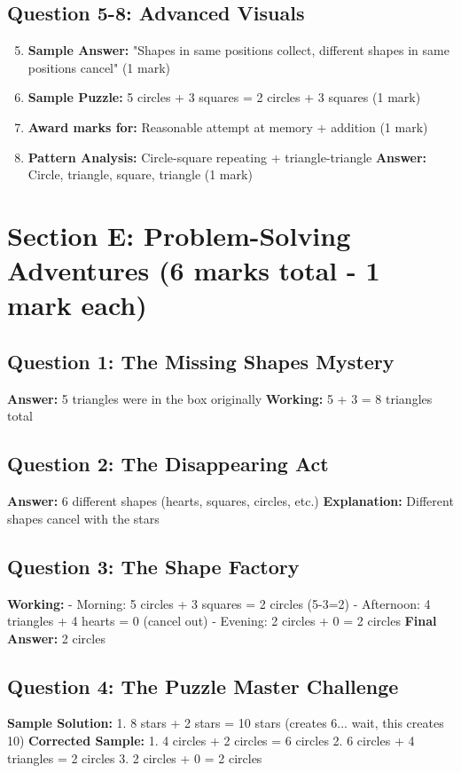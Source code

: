 \documentclass{article}
\begin{document}
\subsection*{Question 5-8: Advanced Visuals}
\begin{enumerate}
    \setcounter{enumi}{4}
    \item \textbf{Sample Answer:} "Shapes in same positions collect, different shapes in same positions cancel" (1 mark)
    
    \item \textbf{Sample Puzzle:} 5 circles + 3 squares = 2 circles + 3 squares (1 mark)
    
    \item \textbf{Award marks for:} Reasonable attempt at memory + addition (1 mark)
    
    \item \textbf{Pattern Analysis:} Circle-square repeating + triangle-triangle
          \textbf{Answer:} Circle, triangle, square, triangle (1 mark)
\end{enumerate}

\section{Section E: Problem-Solving Adventures (6 marks total - 1 mark each)}

\subsection*{Question 1: The Missing Shapes Mystery}
\textbf{Answer:} 5 triangles were in the box originally
\textbf{Working:} 5 + 3 = 8 triangles total

\subsection*{Question 2: The Disappearing Act}  
\textbf{Answer:} 6 different shapes (hearts, squares, circles, etc.)
\textbf{Explanation:} Different shapes cancel with the stars

\subsection*{Question 3: The Shape Factory}
\textbf{Working:}
- Morning: 5 circles + 3 squares = 2 circles (5-3=2)
- Afternoon: 4 triangles + 4 hearts = 0 (cancel out)  
- Evening: 2 circles + 0 = 2 circles
\textbf{Final Answer:} 2 circles

\subsection*{Question 4: The Puzzle Master Challenge}
\textbf{Sample Solution:}
1. 8 stars + 2 stars = 10 stars (creates 6... wait, this creates 10)
\textbf{Corrected Sample:}
1. 4 circles + 2 circles = 6 circles
2. 6 circles + 4 triangles = 2 circles  
3. 2 circles + 0 = 2 circles
\end{document}
